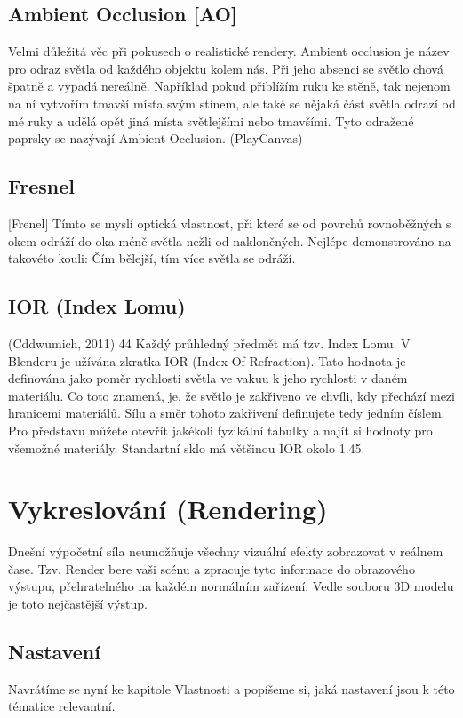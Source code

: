 \documentclass[12pt,a4paper]{report}
\begin{document}
	
	\subsection{Ambient Occlusion [AO]}
	Velmi důležitá věc při pokusech o realistické rendery. Ambient occlusion
	je název pro odraz světla od každého objektu kolem nás. Při jeho absenci
	se světlo chová špatně a vypadá nereálně. Například pokud přiblížím ruku
	ke stěně, tak nejenom na ní vytvořím tmavší místa svým stínem, ale také
	se nějaká část světla odrazí od mé ruky a udělá opět jiná místa
	světlejšími nebo tmavšími. Tyto odražené paprsky se nazývají Ambient
	Occlusion.
	(PlayCanvas)
	
	\subsection{Fresnel}
	[Frenel] Tímto se myslí optická vlastnost, při které se od povrchů
	rovnoběžných s okem odráží do oka méně světla nežli od nakloněných.
	Nejlépe demonstrováno na takovéto kouli:
	Čím bělejší, tím více světla se odráží.
	
	\subsection{IOR (Index Lomu)}
	
	(Cddwumich, 2011)
	44
	Každý průhledný předmět má tzv. Index Lomu. V Blenderu je užívána
	zkratka IOR (Index Of Refraction). Tato hodnota je definována jako
	poměr rychlosti světla ve vakuu k jeho rychlosti v daném materiálu. Co
	toto znamená, je, že světlo je zakřiveno ve chvíli, kdy přechází mezi
	hranicemi materiálů. Sílu a směr tohoto zakřivení definujete tedy jedním
	číslem. Pro představu můžete otevřít jakékoli fyzikální tabulky a najít si
	hodnoty pro všemožné materiály. Standartní sklo má většinou IOR okolo
	1.45.
	
	\section{Vykreslování (Rendering)}
	\label{section:render}
	Dnešní výpočetní síla neumožňuje všechny vizuální efekty zobrazovat v
	reálnem čase. Tzv. Render bere vaši scénu a zpracuje tyto informace do
	obrazového výstupu, přehratelného na každém normálním zařízení. Vedle
	souboru 3D modelu je toto nejčastější výstup.
	\subsection{Nastavení}
	Navrátíme se nyní ke kapitole Vlastnosti a popíšeme si, jaká nastavení
	jsou k této tématice relevantní.
	
\end{document}
